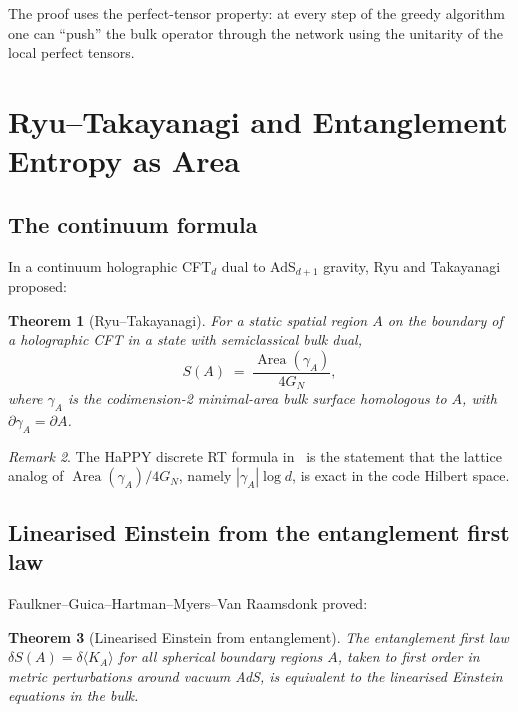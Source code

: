 \documentclass[12pt]{article}
\newtheorem{theorem}{Theorem}[section]
\theoremstyle{definition}
\theoremstyle{remark}
\newtheorem{remark}[theorem]{Remark}
\newcommand{\Area}{\operatorname{Area}}
\begin{document}
The proof uses the perfect-tensor property: at every step of the greedy algorithm one can ``push'' the bulk operator through the network using the unitarity of the local perfect tensors.

\section{Ryu--Takayanagi and Entanglement Entropy as Area}
\label{sec:rt}

\subsection{The continuum formula}

In a continuum holographic CFT$_d$ dual to AdS$_{d+1}$ gravity, Ryu and Takayanagi \cite{ryutakayanagi2006} proposed:

\begin{theorem}[Ryu--Takayanagi]
\label{thm:rt}
For a static spatial region $A$ on the boundary of a holographic CFT in a state with semiclassical bulk dual,
\[
S(A) \;=\; \frac{\Area(\gamma_A)}{4 G_N},
\]
where $\gamma_A$ is the codimension-2 minimal-area bulk surface homologous to $A$, with $\partial \gamma_A = \partial A$.
\end{theorem}

\begin{remark}
The HaPPY discrete RT formula in~ is the statement that the lattice analog of $\Area(\gamma_A)/4G_N$, namely $|\gamma_A| \log d$, is exact in the code Hilbert space.
\end{remark}

\subsection{Linearised Einstein from the entanglement first law}

Faulkner--Guica--Hartman--Myers--Van Raamsdonk \cite{fghmv2014} proved:

\begin{theorem}[Linearised Einstein from entanglement]
\label{thm:linEinstein}
The entanglement first law $\delta S(A) = \delta \langle K_A\rangle$ for all spherical boundary regions $A$, taken to first order in metric perturbations around vacuum AdS, is equivalent to the linearised Einstein equations in the bulk.
\end{theorem}
\end{document}

